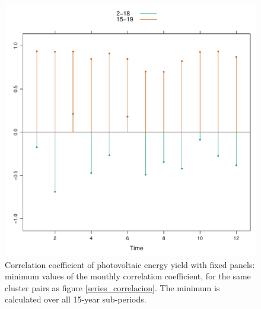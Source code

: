 \begin{figure}[h!]
\includegraphics[scale=0.6]{figs/capitulo5/figure9.pdf}
\caption[Correlation coefficients of the monthly energy yield for the two pairs of clusters with the highest and smallest correlation values over the Iberian Peninsula]{Correlation coefficient of photovoltaic energy yield with fixed panels: minimum values of the monthly correlation coefficient, for the same cluster pairs as figure \ref{series_correlacion}. The minimum is calculated over all 15-year sub-periods.}
\label{series_correlacion_meses}
\end{figure}



